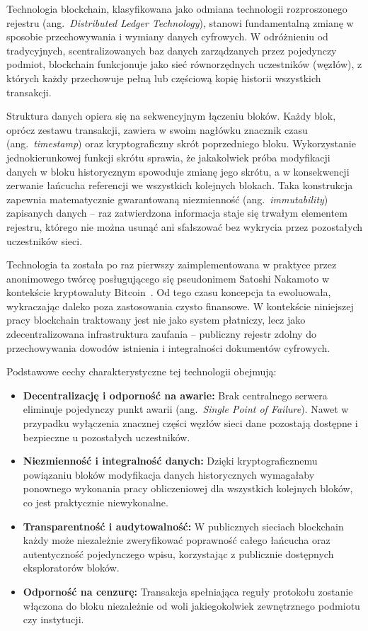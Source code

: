 \documentclass[12pt,a4paper,twoside]{report}
\begin{document}
Technologia blockchain, klasyfikowana jako odmiana technologii rozproszonego rejestru
(ang.~\textit{Distributed Ledger Technology}), stanowi fundamentalną zmianę w sposobie
przechowywania i wymiany danych cyfrowych. W odróżnieniu od tradycyjnych, scentralizowanych
baz danych zarządzanych przez pojedynczy podmiot, blockchain funkcjonuje jako sieć
równorzędnych uczestników (węzłów), z których każdy przechowuje pełną lub częściową kopię
historii wszystkich transakcji.

Struktura danych opiera się na sekwencyjnym łączeniu bloków. Każdy blok, oprócz zestawu
transakcji, zawiera w swoim nagłówku znacznik czasu (ang.~\textit{timestamp}) oraz
kryptograficzny skrót poprzedniego bloku. Wykorzystanie jednokierunkowej funkcji skrótu
sprawia, że jakakolwiek próba modyfikacji danych w bloku historycznym spowoduje zmianę jego
skrótu, a w konsekwencji zerwanie łańcucha referencji we wszystkich kolejnych blokach. Taka
konstrukcja zapewnia matematycznie gwarantowaną niezmienność (ang.~\textit{immutability})
zapisanych danych -- raz zatwierdzona informacja staje się trwałym elementem rejestru,
którego nie można usunąć ani sfałszować bez wykrycia przez pozostałych uczestników sieci.

Technologia ta została po raz pierwszy zaimplementowana w praktyce przez anonimowego twórcę
posługującego się pseudonimem Satoshi Nakamoto w kontekście kryptowaluty
Bitcoin~\cite{nakamoto2008bitcoin}. Od tego czasu koncepcja ta ewoluowała, wykraczając
daleko poza zastosowania czysto finansowe. W kontekście niniejszej pracy blockchain
traktowany jest nie jako system płatniczy, lecz jako zdecentralizowana infrastruktura
zaufania -- publiczny rejestr zdolny do przechowywania dowodów istnienia i integralności
dokumentów cyfrowych.

Podstawowe cechy charakterystyczne tej technologii obejmują:
\begin{itemize}
    \item \textbf{Decentralizację i odporność na awarie:} Brak centralnego serwera eliminuje
          pojedynczy punkt awarii (ang.~\textit{Single Point of Failure}). Nawet w przypadku
          wyłączenia znacznej części węzłów sieci dane pozostają dostępne i bezpieczne
          u pozostałych uczestników.
    \item \textbf{Niezmienność i integralność danych:} Dzięki kryptograficznemu powiązaniu
          bloków modyfikacja danych historycznych wymagałaby ponownego wykonania pracy
          obliczeniowej dla wszystkich kolejnych bloków, co jest praktycznie niewykonalne.
    \item \textbf{Transparentność i audytowalność:} W publicznych sieciach blockchain każdy
          może niezależnie zweryfikować poprawność całego łańcucha oraz autentyczność
          pojedynczego wpisu, korzystając z publicznie dostępnych eksploratorów bloków.
    \item \textbf{Odporność na cenzurę:} Transakcja spełniająca reguły protokołu zostanie
          włączona do bloku niezależnie od woli jakiegokolwiek zewnętrznego podmiotu
          czy instytucji.
\end{itemize}
\end{document}
